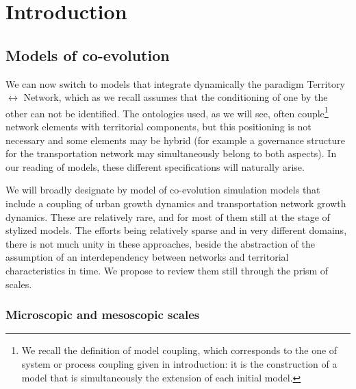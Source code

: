 








\section{Introduction}






\subsection{Models of co-evolution}

We can now switch to models that integrate dynamically the paradigm Territory $\leftrightarrow$ Network, which as we recall assumes that the conditioning of one by the other can not be identified. The ontologies used, as we will see, often couple\footnote{We recall the definition of model coupling, which corresponds to the one of system or process coupling given in introduction: it is the construction of a model that is simultaneously the extension of each initial model.} network elements with territorial components, but this positioning is not necessary and some elements may be hybrid (for example a governance structure for the transportation network may simultaneously belong to both aspects). In our reading of models, these different specifications will naturally arise.

We will broadly designate by model of co-evolution simulation models that include a coupling of urban growth dynamics and transportation network growth dynamics. These are relatively rare, and for most of them still at the stage of stylized models. The efforts being relatively sparse and in very different domains, there is not much unity in these approaches, beside the abstraction of the assumption of an interdependency between networks and territorial characteristics in time. We propose to review them still through the prism of scales.

\subsubsection{Microscopic and mesoscopic scales}



